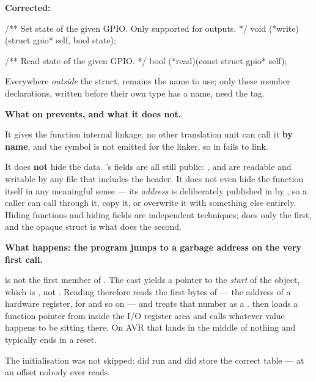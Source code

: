 \textbf{Corrected:}

\begin{ccode}
    /** Set state of the given GPIO. Only supported for outputs. */
    void (*write)(struct gpio* self, bool state);

    /** Read state of the given GPIO. */
    bool (*read)(const struct gpio* self);
\end{ccode}

\noindent Everywhere \emph{outside} the struct,  remains the name to use; only these
member declarations, written before their own type has a name, need the tag. 

\textbf{What  on  prevents, and what it does not.} 

It gives the function internal linkage: no other translation unit can call it \textbf{by name}, and
the symbol is not emitted for the linker, so  in  fails
to link.

It does \textbf{not} hide the data. 's fields are all still public: ,
 and  are readable and writable by any file that includes the
header. It does not even hide the function itself in any meaningful sense --- its \emph{address} is
deliberately published in  by , so a caller can call through it,
copy it, or overwrite it with something else entirely. Hiding functions and hiding fields are
independent techniques;  does only the first, and the opaque struct is what does the
second.

\textbf{What happens: the program jumps to a garbage address on the very first call.}

 is not the first member of . The cast 
yields a pointer to the \emph{start} of the object, which is , not . Reading
 therefore reads the first bytes of  --- the address of a hardware
register,  for  and so on --- and treats that number as a
.  then loads a function pointer from inside the
I/O register area and calls whatever value happens to be sitting there. On AVR that lands in the
middle of nothing and typically ends in a reset.

The initialisation was not skipped:  did run and
did store the correct table --- at an offset nobody ever reads.

